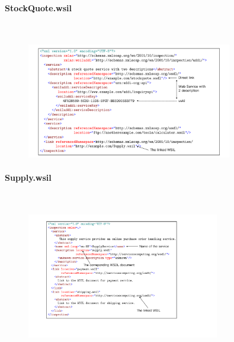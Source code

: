 \paragraph*{StockQuote.wsil}~{} \par
\begin{figure}[H]
    \vspace{-0.5em}
	\centering
	\includegraphics[width=0.8\textwidth]{images/StockQuote.wsil.pdf}
    \vspace{-1em}
\end{figure}

\paragraph*{Supply.wsil}~{} \par
\begin{figure}[H]
    \vspace{-0.5em}
	\centering
	\includegraphics[width=0.75\textwidth]{images/Supply.wsil.pdf}
    \vspace{-3em}
\end{figure}

